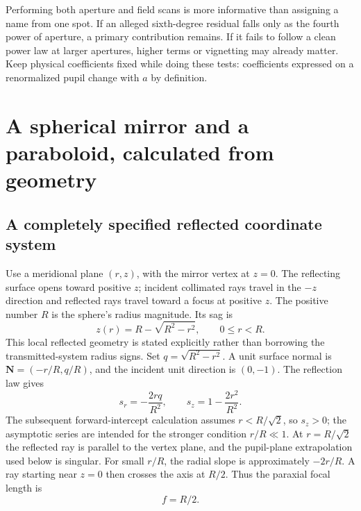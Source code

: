 Performing both aperture and field scans is more informative than assigning
a name from one spot. If an alleged sixth-degree residual falls only as the
fourth power of aperture, a primary contribution remains. If it fails to
follow a clean power law at larger apertures, higher terms or vignetting may
already matter. Keep physical coefficients fixed while doing these tests:
coefficients expressed on a renormalized pupil change with $a$ by definition.

\chapter{A spherical mirror and a paraboloid, calculated from geometry}
\label{ab:mirrors}

\section{A completely specified reflected coordinate system}
Use a meridional plane $(r,z)$, with the mirror vertex at $z=0$. The reflecting
surface opens toward positive $z$; incident collimated rays travel in the
$-z$ direction and reflected rays travel toward a focus at positive $z$.
The positive number $R$ is the sphere's radius magnitude. Its sag is
\begin{equation}
 z(r)=R-\sqrt{R^2-r^2},\qquad 0\leq r<R.
 \label{ab:spheresag}
\end{equation}
This local reflected geometry is stated explicitly rather than borrowing
the transmitted-system radius signs. Set $q=\sqrt{R^2-r^2}$. A unit surface
normal is $\bm N=(-r/R,q/R)$, and the incident unit direction is $(0,-1)$.
The reflection law gives
\begin{equation}
 s_r=-\frac{2rq}{R^2},\qquad
 s_z=1-\frac{2r^2}{R^2}.
 \label{ab:mirrordirection}
\end{equation}
The subsequent forward-intercept calculation assumes $r<R/\sqrt2$, so
$s_z>0$; the asymptotic series are intended for the stronger condition
$r/R\ll1$. At $r=R/\sqrt2$ the reflected ray is parallel to the vertex
plane, and the pupil-plane extrapolation used below is singular.
For small $r/R$, the radial slope is approximately $-2r/R$. A ray starting
near $z=0$ then crosses the axis at $R/2$. Thus the paraxial focal length is
\begin{equation}f=R/2.\end{equation}

